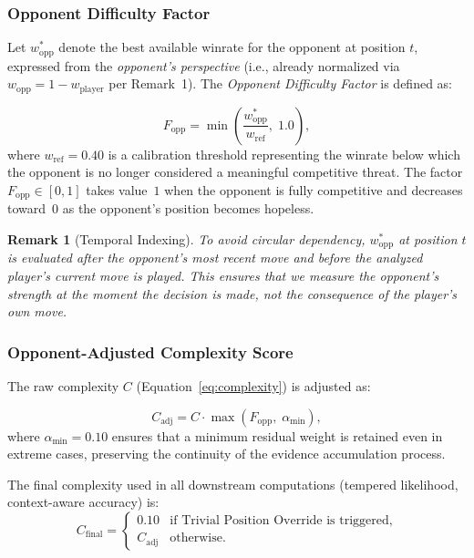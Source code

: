 \documentclass[11pt,a4paper]{article}
\newtheorem{remark}{Remark}
\begin{document}
\subsubsection{Opponent Difficulty Factor}

Let $w^*_{\text{opp}}$ denote the best available winrate for the opponent
at position $t$, expressed from the \emph{opponent's perspective} (i.e.,
already normalized via $w_{\text{opp}} = 1 - w_{\text{player}}$ per
Remark~1). The \emph{Opponent Difficulty Factor} is defined as:

\begin{equation}
    F_{\text{opp}} = \min\!\left(\frac{w^*_{\text{opp}}}{w_{\text{ref}}},\;
    1.0\right),
    \label{eq:f_opp}
\end{equation}
where $w_{\text{ref}} = 0.40$ is a calibration threshold representing the
winrate below which the opponent is no longer considered a meaningful
competitive threat. The factor $F_{\text{opp}} \in [0, 1]$ takes value~$1$
when the opponent is fully competitive and decreases toward~$0$ as the
opponent's position becomes hopeless.

\begin{remark}[Temporal Indexing]
To avoid circular dependency, $w^*_{\text{opp}}$ at position $t$ is
evaluated \emph{after the opponent's most recent move} and \emph{before}
the analyzed player's current move is played. This ensures that we measure
the opponent's strength at the moment the decision is made, not the
consequence of the player's own move.
\end{remark}

\subsubsection{Opponent-Adjusted Complexity Score}

The raw complexity $C$ (Equation~\eqref{eq:complexity}) is adjusted as:

\begin{equation}
    C_{\text{adj}} = C \cdot \max\!\left(F_{\text{opp}},\; \alpha_{\min}\right),
    \label{eq:c_adj}
\end{equation}
where $\alpha_{\min} = 0.10$ ensures that a minimum residual weight is
retained even in extreme cases, preserving the continuity of the evidence
accumulation process.

The final complexity used in all downstream computations (tempered
likelihood, context-aware accuracy) is:
\begin{equation}
    C_{\text{final}} = \begin{cases}
        0.10 & \text{if Trivial Position Override is triggered,} \\
        C_{\text{adj}} & \text{otherwise.}
    \end{cases}
    \label{eq:c_final}
\end{equation}
\end{document}
